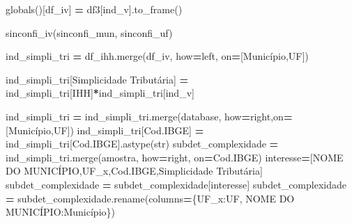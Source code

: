 \documentclass[
  12,
  dvipsnames]{article}
\newenvironment{Shaded}{\begin{snugshade}}{\end{snugshade}}
\newcommand{\BuiltInTok}[1]{#1}
\newcommand{\NormalTok}[1]{#1}
\newcommand{\OperatorTok}[1]{\textcolor[rgb]{0.81,0.36,0.00}{\textbf{#1}}}
\newcommand{\StringTok}[1]{\textcolor[rgb]{0.31,0.60,0.02}{#1}}
\begin{document}
\begin{Shaded}
\begin{Highlighting}[]
    \BuiltInTok{globals}\NormalTok{()[}\StringTok{\textquotesingle{}df\_iv\textquotesingle{}}\NormalTok{] }\OperatorTok{=}\NormalTok{ df3[}\StringTok{\textquotesingle{}ind\_v\textquotesingle{}}\NormalTok{].to\_frame()}
    
\NormalTok{sinconfi\_iv(sinconfi\_mun, sinconfi\_uf)}

\NormalTok{ind\_simpli\_tri }\OperatorTok{=}\NormalTok{ df\_ihh.merge(df\_iv, how}\OperatorTok{=}\StringTok{\textquotesingle{}left\textquotesingle{}}\NormalTok{, on}\OperatorTok{=}\NormalTok{[}\StringTok{\textquotesingle{}Município\textquotesingle{}}\NormalTok{,}\StringTok{\textquotesingle{}UF\textquotesingle{}}\NormalTok{])}

\NormalTok{ind\_simpli\_tri[}\StringTok{\textquotesingle{}Simplicidade Tributária\textquotesingle{}}\NormalTok{] }\OperatorTok{=}\NormalTok{ ind\_simpli\_tri[}\StringTok{\textquotesingle{}IHH\textquotesingle{}}\NormalTok{]}\OperatorTok{*}\NormalTok{ind\_simpli\_tri[}\StringTok{\textquotesingle{}ind\_v\textquotesingle{}}\NormalTok{]}

\NormalTok{ind\_simpli\_tri }\OperatorTok{=}\NormalTok{ ind\_simpli\_tri.merge(database, how}\OperatorTok{=}\StringTok{\textquotesingle{}right\textquotesingle{}}\NormalTok{,on}\OperatorTok{=}\NormalTok{[}\StringTok{\textquotesingle{}Município\textquotesingle{}}\NormalTok{,}\StringTok{\textquotesingle{}UF\textquotesingle{}}\NormalTok{])}
\NormalTok{ind\_simpli\_tri[}\StringTok{\textquotesingle{}Cod.IBGE\textquotesingle{}}\NormalTok{] }\OperatorTok{=}\NormalTok{ ind\_simpli\_tri[}\StringTok{\textquotesingle{}Cod.IBGE\textquotesingle{}}\NormalTok{].astype(}\BuiltInTok{str}\NormalTok{)}
\NormalTok{subdet\_complexidade }\OperatorTok{=}\NormalTok{ ind\_simpli\_tri.merge(amostra, how}\OperatorTok{=}\StringTok{\textquotesingle{}right\textquotesingle{}}\NormalTok{, on}\OperatorTok{=}\StringTok{\textquotesingle{}Cod.IBGE\textquotesingle{}}\NormalTok{)}
\NormalTok{interesse}\OperatorTok{=}\NormalTok{[}\StringTok{\textquotesingle{}NOME DO MUNICÍPIO\textquotesingle{}}\NormalTok{,}\StringTok{\textquotesingle{}UF\_x\textquotesingle{}}\NormalTok{,}\StringTok{\textquotesingle{}Cod.IBGE\textquotesingle{}}\NormalTok{,}\StringTok{\textquotesingle{}Simplicidade Tributária\textquotesingle{}}\NormalTok{]}
\NormalTok{subdet\_complexidade }\OperatorTok{=}\NormalTok{ subdet\_complexidade[interesse]}
\NormalTok{subdet\_complexidade }\OperatorTok{=}\NormalTok{ subdet\_complexidade.rename(columns}\OperatorTok{=}\NormalTok{\{}\StringTok{\textquotesingle{}UF\_x\textquotesingle{}}\NormalTok{:}\StringTok{\textquotesingle{}UF\textquotesingle{}}\NormalTok{,}
                                                          \StringTok{\textquotesingle{}NOME DO MUNICÍPIO\textquotesingle{}}\NormalTok{:}\StringTok{\textquotesingle{}Município\textquotesingle{}}\NormalTok{\})}


\end{Highlighting}
\end{Shaded}
\end{document}
